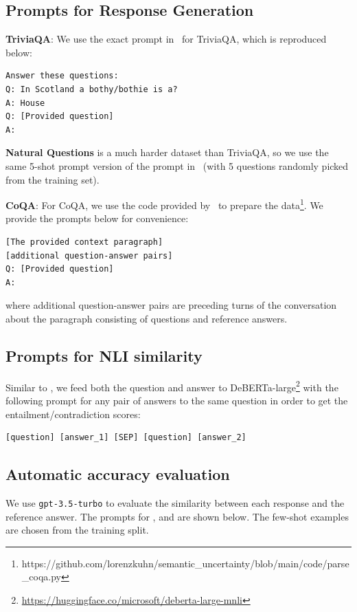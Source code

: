 \subsection{Prompts for Response Generation}
\textbf{TriviaQA}:
We use the exact prompt in~\cite{touvron2023llama} for TriviaQA, which is reproduced below:
{\scriptsize
\begin{verbatim}
Answer these questions:
Q: In Scotland a bothy/bothie is a?
A: House
Q: [Provided question]
A: 
\end{verbatim}
}

\textbf{Natural Questions} is a much harder dataset than TriviaQA, so we use the same 5-shot prompt version of the prompt in~\cite{touvron2023llama} (with 5 questions randomly picked from the training set).


\textbf{CoQA}:
For CoQA, we use the code provided by~\cite{kuhn2023semantic} to prepare the data\footnote{https://github.com/lorenzkuhn/semantic\_uncertainty/blob/main/code/parse\_coqa.py}.
We provide the prompts below for convenience:
{\scriptsize
\begin{verbatim}
[The provided context paragraph]
[additional question-answer pairs]
Q: [Provided question]
A:
\end{verbatim}
}
where additional question-answer pairs are preceding turns of the conversation about
the paragraph consisting of questions and reference answers.

\subsection{Prompts for NLI similarity}
Similar to \citet{kuhn2023semantic}, we feed both the question and answer to DeBERTa-large\footnote{\url{https://huggingface.co/microsoft/deberta-large-mnli}} with the following prompt for any pair of answers to the same question in order to get the entailment/contradiction scores:
{\scriptsize
\begin{verbatim}
[question] [answer_1] [SEP] [question] [answer_2]
\end{verbatim}
}


\subsection{Automatic accuracy evaluation}%
We use \texttt{gpt-3.5-turbo} to evaluate the similarity between each response and the reference answer.
The prompts for \datasetcoqa, \datasettrivia and \datasetnqopen are shown below. The few-shot examples are chosen from the training split.

